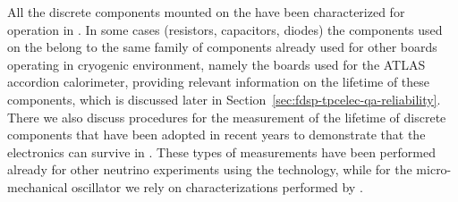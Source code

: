 All the discrete components mounted on the  have been
characterized for operation in . In some cases (resistors,
capacitors, diodes) the components used on the  
belong to the same family of components already used for other boards
operating in cryogenic environment, namely the boards used for the 
ATLAS accordion  calorimeter, providing relevant information
on the lifetime of these components, which is discussed later in 
Section~\ref{sec:fdsp-tpcelec-qa-reliability}. There we also discuss
procedures for the measurement of the lifetime of discrete
components that have been adopted in recent years to demonstrate
that the  electronics can survive in . 
These types of measurements have been performed already for 
other neutrino experiments using the  
technology, while for the micro-mechanical oscillator we 
rely on characterizations performed by .

